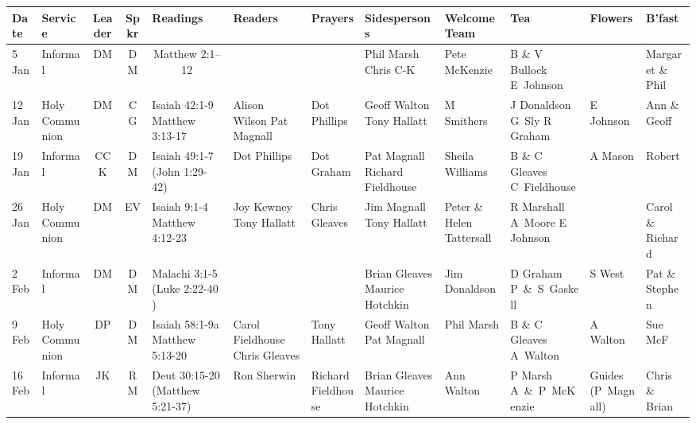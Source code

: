 \documentclass[10pt]{article}
\begin{document}
\begin{center}
{\begin{tabular}{|%
p{}| %
p{}| %
c| %
c| %
X{}| %
X{}| %
p{}| %
X{}| %
X{}| %
X{}| %
p{}| %
p{}|}\hline %
 Date & Service & Leader & Spkr & Readings & Readers & Prayers &
Sidespersons & Welcome Team & Tea &  Flowers & B'fast   \\ \hline %
\hline
\toprule
5 Jan & Informal & DM & DM & \multicolumn{1}{c|}{Matthew 2:1--12} &   &   & Phil Marsh Chris C-K & Pete McKenzie & B \& V Bullock E~Johnson &   & Margaret \& Phil \\ \hline
12 Jan & Holy Communion & DM & CG & Isaiah 42:1-9 Matthew 3:13-17& Alison Wilson Pat Magnall  & Dot Phillips & Geoff Walton Tony Hallatt & M Smithers & J Donaldson G~Sly  R Graham & E Johnson & Ann \& Geoff \\ \hline
19 Jan & Informal & CCK & DM & Isaiah 49:1-7 (John 1:29-42) & Dot Phillips & Dot Graham & Pat Magnall Richard Fieldhouse & Sheila Williams & B \& C Gleaves C~Fieldhouse & A Mason & Robert \\ \hline
26 Jan & Holy Communion & DM & EV & Isaiah 9:1-4 Matthew 4:12-23 & Joy Kewney  Tony Hallatt & Chris Gleaves & Jim Magnall Tony Hallatt & Peter \& Helen Tattersall & R Marshall A~Moore E Johnson  &   & Carol \& Richard \\ \hline
2 Feb & Informal & DM & DM & Malachi 3:1-5 (Luke 2:22-40 ) &  &   & Brian Gleaves Maurice Hotchkin  & Jim Donaldson &  D Graham    P~\&~S~Gaskell   & S West & Pat \& Stephen \\ \hline
9 Feb & Holy Communion & DP & DM & Isaiah 58:1-9a Matthew 5:13-20  & Carol Fieldhouse Chris Gleaves & Tony Hallatt & Geoff Walton Pat Magnall & Phil Marsh & B \& C Gleaves A~Walton & A Walton & Sue McF \\ \hline
16 Feb & Informal & JK & RM &Deut 30:15-20 (Matthew 5:21-37)  & Ron Sherwin & Richard Fieldhouse & Brian Gleaves  Maurice Hotchkin & Ann Walton & P Marsh  A~\&~P~McKenzie  & Guides (P~Magnall) & Chris \& Brian \\ \hline

\end{tabular}}
\end{center}
\end{document}
